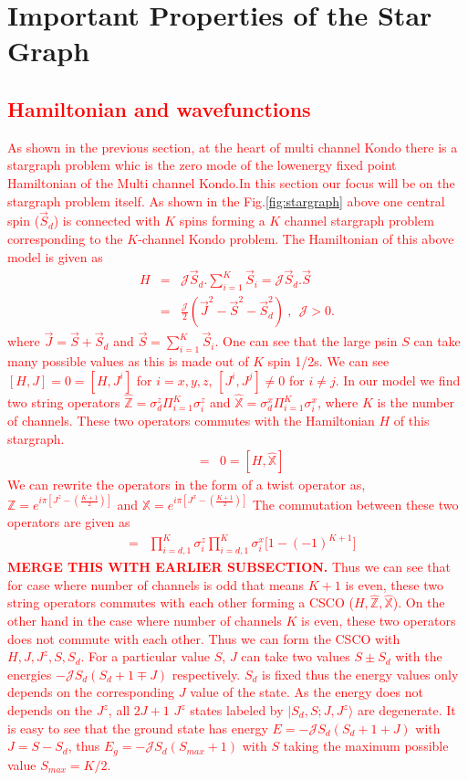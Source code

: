 \documentclass[reprint,prb,superscriptaddress]{revtex4-2}
\begin{document}
\section{Important Properties of the Star Graph}
\textcolor{red}{\subsection{Hamiltonian and wavefunctions}
\noindent As shown in the previous section, at the heart of multi channel Kondo there is a stargraph problem whic is the zero mode of the lowenergy fixed point Hamiltonian of the Multi channel Kondo.In this section our focus will be on the stargraph problem itself.
As shown in the Fig.\ref{fig:stargraph} above one central spin ($\vec{S}_d$) is connected with $K$ spins forming a $K$ channel stargraph problem corresponding to the $K$-channel Kondo problem. The Hamiltonian of this above model is given as 
\begin{eqnarray}
H &=& {\mathcal{J}} \vec{S}_d.\sum_{i=1}^{K}\vec{S}_i={\mathcal{J}} \vec{S}_d.\vec{S} \nonumber\\
&=& \frac{{\mathcal{J}}}{2} (\vec{J}^2-\vec{S}^2-\vec{S}_d^2)~,~~{\mathcal{J}} >0.
\label{eq:stargraph_hamiltonian}
\end{eqnarray}
where $\vec{J}=\vec{S}+\vec{S}_d$ and $\vec{S}=\sum_{i=1}^{K} \vec{S}_i$. One can see that the large psin $S$ can take many possible values as this is made out of $K$ spin 1/2s. We can see $[H,J]=0=[H,J^i]$ for  $i=x,y,z$, $[J^i,J^j]\neq 0$ for $i\neq j$. In our model we find two string operators $\hat{\mathbb{Z}}=\sigma_d^z\Pi_{i=1}^{K} \sigma_i^z$ and $\hat{\mathbb{X}}=\sigma_d^x\Pi_{i=1}^{K} \sigma_i^x$, where $K$ is the number of channels. These two operators commutes with the Hamiltonian $H$ of this stargraph.
\begin{eqnarray}
[H,\hat{\mathbb{Z}}] &=& 0 = [H,\hat{\mathbb{X}}]
\end{eqnarray}
We can rewrite the operators in the form of a twist operator as, $\mathbb{Z}=e^{i\pi [J^z-(\frac{K+1}{2})]}$ and $\mathbb{X}=e^{i\pi [J^x-(\frac{K+1}{2})]}$
The commutation between these two operators are given as
\begin{eqnarray}
[\mathbb{Z},\mathbb{X}] &=& \prod_{i=d,1}^{K} \sigma^z_{i} \prod_{i=d,1}^{K} \sigma^x_{i} \bigg[1-(-1)^{K+1}\bigg]
\end{eqnarray}
\textbf{MERGE THIS WITH EARLIER SUBSECTION.}
Thus we can see that for case where number of channels is odd that means $K+1$ is even, these two string operators commutes with each other forming a CSCO ($H,\hat{\mathbb{Z}},\hat{\mathbb{X}}$). On the other hand in the case where number of channels $K$ is even, these two operators does not commute with each other. Thus we can form the CSCO with $H,J,J^z,S,S_d$. For a particular value $S$, $J$ can take two values $S\pm S_d$ with the energies $-{\mathcal{J}} S_d(S_d+1\mp J)$ respectively. $S_d$ is fixed thus the energy values only depends on the corresponding $J$ value of the state. As the energy does not depends on the $J^z$, all $2J+1$ $J^z$ states labeled by $|S_d,S;J,J^z\rangle$ are degenerate. It is easy to see that the ground state has energy $E=-{\mathcal{J}} S_d(S_d+1+J)$ with  $J=S-S_d$, thus $E_g=-{\mathcal{J}} S_d(S_{max}+1)$ with $S$ taking the maximum possible value $S_{max}=K/2$.
}
\end{document}
